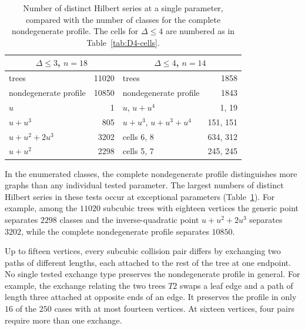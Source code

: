 \documentclass[reqno]{article}
\theoremstyle{plain} %
\theoremstyle{definition}
\theoremstyle{remark}
\numberwithin{equation}{section}
\begin{document}
\begin{table}[htbp]
\medskip
\centering\renewcommand{\arraystretch}{1.12}\small
\begin{tabular}{lr@{\qquad\qquad}lr}\toprule
\multicolumn{2}{c}{$\Delta\le3$, $n=18$}&\multicolumn{2}{c}{$\Delta\le4$, $n=14$}\\\midrule
trees & 11020 & trees & 1858\\
nondegenerate profile & 10850 & nondegenerate profile & 1843\\\midrule
$u$ & 1 & $u$, $u+u^4$ & 1, 19\\
$u+u^3$ & 805 & $u+u^3$, $u+u^3+u^4$ & 151, 151\\
$u+u^2+2u^3$ & 3202 & cells 6, 8 & 634, 312\\
$u+u^2$ & 2298 & cells 5, 7 & 245, 245\\\bottomrule
\end{tabular}
\caption{Number of distinct Hilbert series at a single parameter, compared
with the number of classes for the complete nondegenerate profile. The cells for
$\Delta\le4$ are numbered as in Table~\ref{tab:D4-cells}.}
\label{tab:single-point}
\end{table}

In the enumerated classes, the complete nondegenerate profile
distinguishes more graphs than any individual tested parameter. The
largest numbers of distinct Hilbert series in these tests occur at
exceptional parameters (Table~\ref{tab:single-point}). For example, among the $11020$
subcubic trees with eighteen vertices the generic point separates $2298$
classes and the inverse-quadratic point $u+u^2+2u^3$ separates $3202$,
while the complete nondegenerate profile separates $10850$.

Up to fifteen vertices, every subcubic collision pair differs by
exchanging two paths of different lengths, each attached to the rest
of the tree at one endpoint. No single tested exchange type preserves
the nondegenerate profile in general. For example, the exchange relating
the two trees $T2$ swaps a leaf edge and a path of length three attached
at opposite ends of an edge. It preserves the profile in only $16$ of
the $250$ cases with at most fourteen vertices. At sixteen vertices,
four pairs require more than one exchange.
\end{document}
